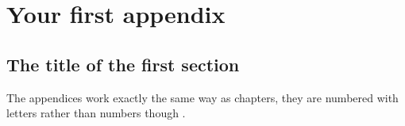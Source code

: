 \chapter{Your first appendix}
\section{The title of the first section}
The appendices work exactly the same way as chapters, they are numbered with letters rather than numbers though \autocite{Ogat2010}.